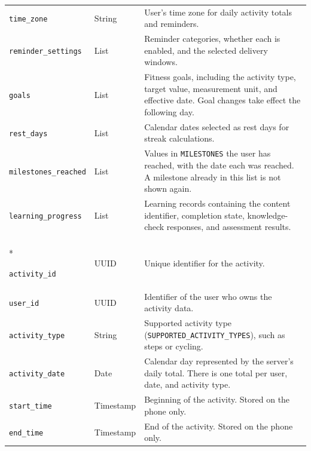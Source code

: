 \documentclass[12pt]{article}
\begin{document}
\begin{longtable}{
    @{}p{}
    p{}
    p{}@{}
}
\texttt{time\_zone} & String &
User's time zone for daily activity totals and reminders.\\

\texttt{reminder\_settings} & List &
Reminder categories, whether each is enabled, and the selected
delivery windows.\\

\texttt{goals} & List &
Fitness goals, including the activity type, target value,
measurement unit, and effective date. Goal changes take effect
the following day.\\

\texttt{rest\_days} & List &
Calendar dates selected as rest days for streak calculations.\\

\texttt{milestones\_reached} & List &
Values in \texttt{MILESTONES} the user has reached, with the date each was
reached. A milestone already in this list is not shown again.\\

\texttt{learning\_progress} & List &
Learning records containing the content identifier, completion
state, knowledge-check responses, and assessment results.\\

\addlinespace


\multicolumn{3}{@{}l}{\textbf{Activity Record --- Phone and server}}\\*
\midrule

\texttt{activity\_id} & UUID &
Unique identifier for the activity.\\

\texttt{user\_id} & UUID &
Identifier of the user who owns the activity data.\\

\texttt{activity\_type} & String &
Supported activity type (\texttt{SUPPORTED\_ACTIVITY\_TYPES}), such as
steps or cycling.\\

\texttt{activity\_date} & Date &
Calendar day represented by the server's daily total.
There is one total per user, date, and activity type.\\

\texttt{start\_time} & Timestamp &
Beginning of the activity. Stored on the phone only.\\

\texttt{end\_time} & Timestamp &
End of the activity. Stored on the phone only.\\


\end{longtable}
\end{document}

